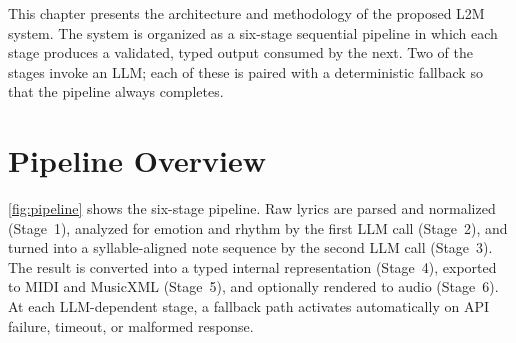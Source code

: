 This chapter presents the architecture and methodology of the proposed L2M
system. The system is organized as a six-stage sequential pipeline in which
each stage produces a validated, typed output consumed by the next. Two of
the stages invoke an LLM; each of these is paired with a deterministic
fallback so that the pipeline always completes.

\section{Pipeline Overview}
\label{sec:mt-pipeline}

\ref{fig:pipeline} shows the six-stage pipeline. Raw lyrics are
parsed and normalized (Stage~1), analyzed for emotion and rhythm by the
first LLM call (Stage~2), and turned into a syllable-aligned note sequence
by the second LLM call (Stage~3). The result is converted into a typed
internal representation (Stage~4), exported to MIDI and MusicXML (Stage~5),
and optionally rendered to audio (Stage~6). At each LLM-dependent stage, a
fallback path activates automatically on API failure, timeout, or malformed
response.


